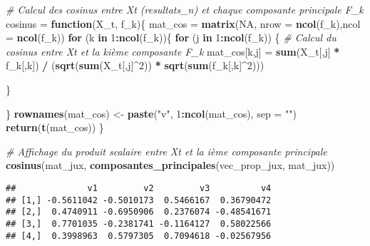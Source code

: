\documentclass[
]{article}
\newenvironment{Shaded}{\begin{snugshade}}{\end{snugshade}}
\newcommand{\AttributeTok}[1]{\textcolor[rgb]{0.13,0.29,0.53}{#1}}
\newcommand{\CommentTok}[1]{\textcolor[rgb]{0.56,0.35,0.01}{\textit{#1}}}
\newcommand{\ConstantTok}[1]{\textcolor[rgb]{0.56,0.35,0.01}{#1}}
\newcommand{\ControlFlowTok}[1]{\textcolor[rgb]{0.13,0.29,0.53}{\textbf{#1}}}
\newcommand{\DecValTok}[1]{\textcolor[rgb]{0.00,0.00,0.81}{#1}}
\newcommand{\FunctionTok}[1]{\textcolor[rgb]{0.13,0.29,0.53}{\textbf{#1}}}
\newcommand{\NormalTok}[1]{#1}
\newcommand{\OtherTok}[1]{\textcolor[rgb]{0.56,0.35,0.01}{#1}}
\newcommand{\SpecialCharTok}[1]{\textcolor[rgb]{0.81,0.36,0.00}{\textbf{#1}}}
\newcommand{\StringTok}[1]{\textcolor[rgb]{0.31,0.60,0.02}{#1}}
\begin{document}
\begin{Shaded}
\begin{Highlighting}[]
\CommentTok{\# Calcul des cosinus entre Xt (resultats\_n) et chaque composante principale F\_k}
\NormalTok{cosinus }\OtherTok{=} \ControlFlowTok{function}\NormalTok{(X\_t, f\_k)\{}
\NormalTok{  mat\_cos }\OtherTok{=} \FunctionTok{matrix}\NormalTok{(}\ConstantTok{NA}\NormalTok{, }\AttributeTok{nrow =} \FunctionTok{ncol}\NormalTok{(f\_k),}\AttributeTok{ncol =} \FunctionTok{ncol}\NormalTok{(f\_k))}
  \ControlFlowTok{for}\NormalTok{ (k }\ControlFlowTok{in} \DecValTok{1}\SpecialCharTok{:}\FunctionTok{ncol}\NormalTok{(f\_k))\{}
    \ControlFlowTok{for}\NormalTok{ (j }\ControlFlowTok{in} \DecValTok{1}\SpecialCharTok{:}\FunctionTok{ncol}\NormalTok{(f\_k)) \{}
           \CommentTok{\# Calcul du cosinus entre Xt et la kième composante F\_k}
\NormalTok{           mat\_cos[k,j] }\OtherTok{=} \FunctionTok{sum}\NormalTok{(X\_t[,j] }\SpecialCharTok{*}\NormalTok{ f\_k[,k]) }\SpecialCharTok{/}\NormalTok{ (}\FunctionTok{sqrt}\NormalTok{(}\FunctionTok{sum}\NormalTok{(X\_t[,j]}\SpecialCharTok{\^{}}\DecValTok{2}\NormalTok{)) }\SpecialCharTok{*}
                                                      \FunctionTok{sqrt}\NormalTok{(}\FunctionTok{sum}\NormalTok{(f\_k[,k]}\SpecialCharTok{\^{}}\DecValTok{2}\NormalTok{))) }
           
\NormalTok{    \}}

\NormalTok{  \}}
  \FunctionTok{rownames}\NormalTok{(mat\_cos) }\OtherTok{\textless{}{-}} \FunctionTok{paste}\NormalTok{(}\StringTok{"v"}\NormalTok{, }\DecValTok{1}\SpecialCharTok{:}\FunctionTok{ncol}\NormalTok{(mat\_cos), }\AttributeTok{sep =} \StringTok{""}\NormalTok{)}
  \FunctionTok{return}\NormalTok{(}\FunctionTok{t}\NormalTok{(mat\_cos))}
\NormalTok{\}}

\CommentTok{\# Affichage du produit scalaire entre Xt et la ième composante principale }
\FunctionTok{cosinus}\NormalTok{(mat\_jux, }\FunctionTok{composantes\_principales}\NormalTok{(vec\_prop\_jux, mat\_jux)) }
\end{Highlighting}
\end{Shaded}

\begin{verbatim}
##              v1         v2         v3          v4
## [1,] -0.5611042 -0.5010173  0.5466167  0.36790472
## [2,]  0.4740911 -0.6950906  0.2376074 -0.48541671
## [3,]  0.7701035 -0.2381741 -0.1164127  0.58022566
## [4,]  0.3998963  0.5797305  0.7094618 -0.02567956
\end{verbatim}
\end{document}
